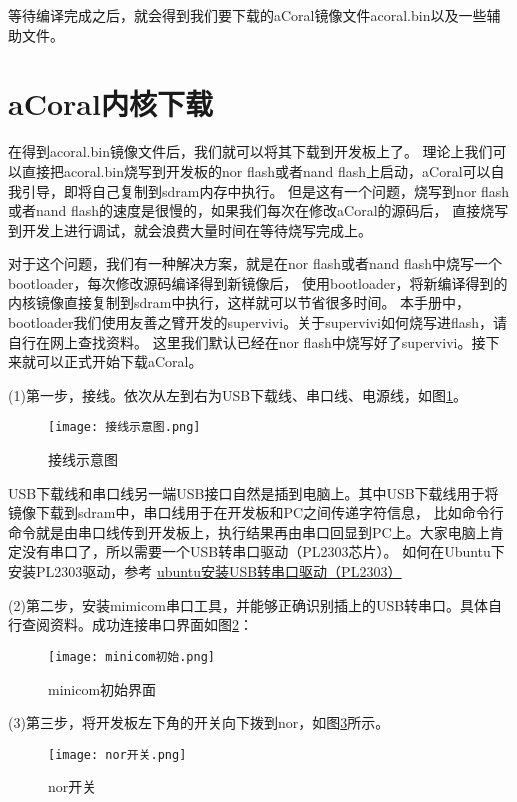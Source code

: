 等待编译完成之后，就会得到我们要下载的aCoral镜像文件acoral.bin以及一些辅助文件。

\section{aCoral内核下载}

在得到acoral.bin镜像文件后，我们就可以将其下载到开发板上了。
理论上我们可以直接把acoral.bin烧写到开发板的nor flash或者nand flash上启动，aCoral可以自我引导，即将自己复制到sdram内存中执行。
但是这有一个问题，烧写到nor flash或者nand flash的速度是很慢的，如果我们每次在修改aCoral的源码后，
直接烧写到开发上进行调试，就会浪费大量时间在等待烧写完成上。

对于这个问题，我们有一种解决方案，就是在nor flash或者nand flash中烧写一个bootloader，每次修改源码编译得到新镜像后，
使用bootloader，将新编译得到的内核镜像直接复制到sdram中执行，这样就可以节省很多时间。
本手册中，bootloader我们使用友善之臂开发的supervivi。关于supervivi如何烧写进flash，请自行在网上查找资料。
这里我们默认已经在nor flash中烧写好了supervivi。接下来就可以正式开始下载aCoral。

(1)第一步，接线。依次从左到右为USB下载线、串口线、电源线，如图\ref{接线示意图}。
\begin{figure}[H]
	\texttt{[image: 接线示意图.png]}
	\caption{接线示意图}
	\label{接线示意图}
\end{figure}

USB下载线和串口线另一端USB接口自然是插到电脑上。其中USB下载线用于将镜像下载到sdram中，串口线用于在开发板和PC之间传递字符信息，
比如命令行命令就是由串口线传到开发板上，执行结果再由串口回显到PC上。大家电脑上肯定没有串口了，所以需要一个USB转串口驱动（PL2303芯片）。
如何在Ubuntu下安装PL2303驱动，参考 \href{https://blog.csdn.net/qq_34562093/article/details/75059251}{\underline{ubuntu安装USB转串口驱动（PL2303）}}

(2)第二步，安装mimicom串口工具，并能够正确识别插上的USB转串口。具体自行查阅资料。成功连接串口界面如图\ref{minicom初始}：
\begin{figure}[H]
	\texttt{[image: minicom初始.png]}
	\caption{minicom初始界面}
	\label{minicom初始}
\end{figure}

(3)第三步，将开发板左下角的开关向下拨到nor，如图\ref{nor开关}所示。
\begin{figure}[H]
	\texttt{[image: nor开关.png]}
	\caption{nor开关}
	\label{nor开关}
\end{figure}

